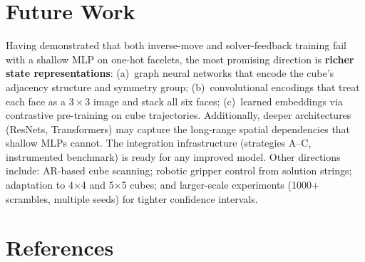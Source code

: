 \documentclass[10pt,twocolumn,a4paper]{article}
\begin{document}
\section{Future Work}
\label{sec:future}

Having demonstrated that both inverse-move and solver-feedback training fail with a shallow MLP on one-hot facelets, the most promising direction is \textbf{richer state representations}: (a)~graph neural networks that encode the cube's adjacency structure and symmetry group; (b)~convolutional encodings that treat each face as a $3{\times}3$ image and stack all six faces; (c)~learned embeddings via contrastive pre-training on cube trajectories. Additionally, deeper architectures (ResNets, Transformers) may capture the long-range spatial dependencies that shallow MLPs cannot. The integration infrastructure (strategies A--C, instrumented benchmark) is ready for any improved model. Other directions include: AR-based cube scanning; robotic gripper control from solution strings; adaptation to 4$\times$4 and 5$\times$5 cubes; and larger-scale experiments (1000+ scrambles, multiple seeds) for tighter confidence intervals.

\section*{References}
\end{document}
